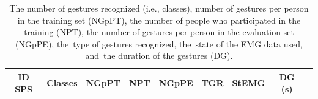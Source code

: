 \documentclass[sensors,review,accept,moreauthors,pdftex]{Definitions/mdpi}
\begin{document}
\begin{table}[H]
\centering
\caption{The number of gestures recognized (i.e., classes), number of gestures per person in the training set (NGpPT), the number of people who participated in the training (NPT), the number of gestures per person in the evaluation set (NGpPE), the~type of gestures recognized, the~state of the EMG data used, and~the duration of the gestures (DG).} \label{tab:12}
\begin{tabular}{ccccccccc}
	\toprule
	
	\textbf{ID SPS}&\textbf{Classes}&\textbf{NGpPT}&\textbf{NPT} &\textbf{NGpPE}&\textbf{TGR}&\textbf{StEMG}&\textbf{DG (s)}\\
	\midrule
%
%	
%	
		
		


\end{tabular}
\end{table}
\end{document}
